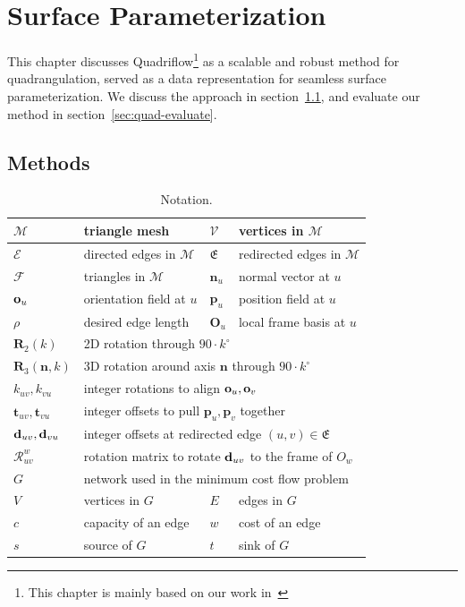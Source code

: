 \chapter{Surface Parameterization}
\label{chapter:param}
This chapter discusses Quadriflow\footnote{This chapter is mainly based on our work in~\cite{huang2018quadriflow}} as a scalable and robust method for quadrangulation, served as a data representation for seamless surface parameterization. We discuss the approach in section~\ref{sec:quad-method}, and evaluate our method in section~\ref{sec:quad-evaluate}.

\section{Methods}
\label{sec:quad-method}
\begin{table}
\centering
\caption{Notation.}
\label{tab:quad-notation}
\begin{tabular}{|l|l|l|l|}
\hline
$\mathcal{M}$ & triangle mesh &
$\mathcal{V}$ & vertices in $\mathcal{M}$\\
\hline
$\mathcal{E}$ & directed edges in $\mathcal{M}$ &
$\mathfrak{E}$ & redirected edges in $\mathcal{M}$\\
\hline
$\mathcal{F}$ & triangles in $\mathcal{M}$ &
$\mathbf{n}_u$ & normal vector at $u$ \\
\hline
$\mathbf{o}_u$ & orientation field at $u$ &
$\mathbf{p}_u$ & position field at $u$\\
\hline
$\rho$ & desired edge length &
$\mathbf{O}_u$ & local frame basis at $u$ \\
\hline
$\mathbf{R}_2(k)$ & \multicolumn{3}{l|}{2D rotation through $90 \cdot k^\circ$}\\
\hline
$\mathbf{R}_3(\mathbf{n},k)$ & \multicolumn{3}{l|}{3D rotation around axis $\mathbf{n}$ through $90 \cdot k^\circ$}\\
\hline
$k_{uv},k_{vu}$ & \multicolumn{3}{l|}{integer rotations to align $\mathbf{o}_u,\mathbf{o}_v$}\\
\hline
$\mathbf{t}_{uv},\mathbf{t}_{vu}$ & \multicolumn{3}{l|}{integer offsets to pull $\mathbf{p}_u,\mathbf{p}_v$ together}\\
\hline
${\mathbf{d}}_{uv},{\mathbf{d}}_{vu}$ & \multicolumn{3}{l|}{integer offsets at redirected edge $(u,v)\in\mathfrak{E}$}\\
\hline
$\mathcal{R}^w_{uv}$ & \multicolumn{3}{l|}{rotation matrix to rotate ${\mathbf{d}}_{uv}$ to the frame of $O_w$} \\
\hline
$G$ & \multicolumn{3}{l|}{ network used in the minimum cost flow problem} \\
\hline
$V$ & vertices in $G$ &
$E$ & edges in $G$ \\
\hline
$c$ & capacity of an edge &
$w$ & cost of an edge \\
\hline
$s$ & source of $G$ &
$t$ & sink of $G$ \\
\hline
\end{tabular}
\end{table}


